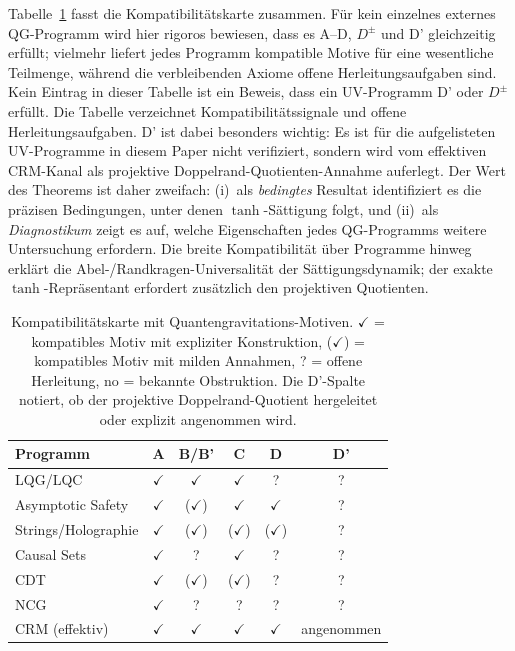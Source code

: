 \documentclass[aps,prd,twocolumn,superscriptaddress,nofootinbib]{revtex4-2}
\begin{document}
Tabelle~\ref{tab:axiom_check} fasst die Kompatibilitätskarte zusammen. Für kein einzelnes externes QG-Programm wird hier rigoros bewiesen, dass es A--D, $D^\pm$ und D' gleichzeitig erfüllt; vielmehr liefert jedes Programm kompatible Motive für eine wesentliche Teilmenge, während die verbleibenden Axiome offene Herleitungsaufgaben sind. Kein Eintrag in dieser Tabelle ist ein Beweis, dass ein UV-Programm D' oder $D^\pm$ erfüllt. Die Tabelle verzeichnet Kompatibilitätssignale und offene Herleitungsaufgaben. D' ist dabei besonders wichtig: Es ist für die aufgelisteten UV-Programme in diesem Paper nicht verifiziert, sondern wird vom effektiven CRM-Kanal als projektive Doppelrand-Quotienten-Annahme auferlegt. Der Wert des Theorems ist daher zweifach: (i)~als \textit{bedingtes} Resultat identifiziert es die präzisen Bedingungen, unter denen $\tanh$-Sättigung folgt, und (ii)~als \textit{Diagnostikum} zeigt es auf, welche Eigenschaften jedes QG-Programms weitere Untersuchung erfordern. Die breite Kompatibilität über Programme hinweg erklärt die Abel-/Randkragen-Universalität der Sättigungsdynamik; der exakte $\tanh$-Repräsentant erfordert zusätzlich den projektiven Quotienten.

\begin{table}[t]
\caption{Kompatibilitätskarte mit Quantengravitations-Motiven. $\checkmark$ = kompatibles Motiv mit expliziter Konstruktion, ($\checkmark$) = kompatibles Motiv mit milden Annahmen, ? = offene Herleitung, no = bekannte Obstruktion. Die D'-Spalte notiert, ob der projektive Doppelrand-Quotient hergeleitet oder explizit angenommen wird.}
\label{tab:axiom_check}
\begin{ruledtabular}
\begin{tabular}{lccccc}
Programm & A & B/B' & C & D & D' \\
\hline
LQG/LQC & $\checkmark$ & $\checkmark$ & $\checkmark$ & ? & ? \\
Asymptotic Safety & $\checkmark$ & ($\checkmark$) & $\checkmark$ & $\checkmark$ & ? \\
Strings/Holographie & $\checkmark$ & ($\checkmark$) & ($\checkmark$) & ($\checkmark$) & ? \\
Causal Sets & $\checkmark$ & ? & $\checkmark$ & ? & ? \\
CDT & $\checkmark$ & ($\checkmark$) & ($\checkmark$) & ? & ? \\
NCG & $\checkmark$ & ? & ? & ? & ? \\
CRM (effektiv) & $\checkmark$ & $\checkmark$ & $\checkmark$ & $\checkmark$ & angenommen \\
\end{tabular}
\end{ruledtabular}
\end{table}
\end{document}
